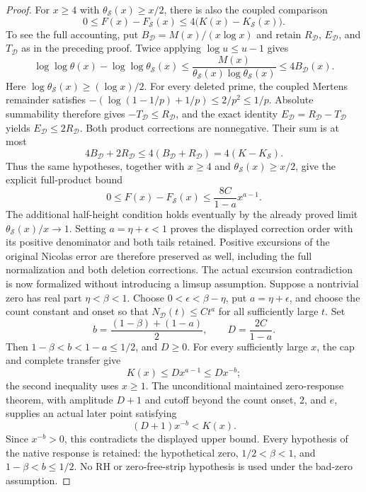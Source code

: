 \documentclass[11pt]{article}
\theoremstyle{definition}
\begin{document}
\begin{proof}
For \(x\ge4\) with \(\theta_{\mathcal S}(x)\ge x/2\), there is also
the coupled comparison
\[
 0\le F(x)-F_{\mathcal S}(x)
 \le4\bigl(K(x)-K_{\mathcal S}(x)\bigr).
\]
To see the full accounting, put
\(B_{\mathcal D}=M(x)/(x\log x)\) and retain
\(R_{\mathcal D}\), \(E_{\mathcal D}\), and \(T_{\mathcal D}\)
as in the preceding proof. Twice applying \(\log u\le u-1\) gives
\[
 \log\log\theta(x)-\log\log\theta_{\mathcal S}(x)
 \le\frac{M(x)}
          {\theta_{\mathcal S}(x)\log\theta_{\mathcal S}(x)}
 \le4B_{\mathcal D}(x).
\]
Here \(\log\theta_{\mathcal S}(x)\ge(\log x)/2\).
For every deleted prime, the coupled Mertens remainder satisfies
\(-(\log(1-1/p)+1/p)\le2/p^2\le1/p\).
Absolute summability therefore gives
\(-T_{\mathcal D}\le R_{\mathcal D}\), and the exact identity
\(E_{\mathcal D}=R_{\mathcal D}-T_{\mathcal D}\) yields
\(E_{\mathcal D}\le2R_{\mathcal D}\).
Both product corrections are nonnegative. Their sum is at most
\[
 4B_{\mathcal D}+2R_{\mathcal D}
 \le4(B_{\mathcal D}+R_{\mathcal D})
 =4(K-K_{\mathcal S}).
\]
Thus the same hypotheses, together with \(x\ge4\) and
\(\theta_{\mathcal S}(x)\ge x/2\), give the explicit full-product bound
\[
 0\le F(x)-F_{\mathcal S}(x)\le
       \frac{8C}{1-a}x^{a-1}.
\]
The additional half-height condition holds eventually by the already
proved limit \(\theta_{\mathcal S}(x)/x\to1\).
Setting \(a=\eta+\epsilon<1\) proves the displayed correction order
with its positive denominator and both tails retained.
Positive excursions of the original Nicolas error
are therefore preserved as well, including the full normalization
and both deletion corrections.
The actual excursion contradiction is now formalized without introducing
a limsup assumption. Suppose a nontrivial zero has real part
\(\eta<\beta<1\). Choose \(0<\epsilon<\beta-\eta\), put
\(a=\eta+\epsilon\), and choose the count constant and onset so that
\(N_{\mathcal D}(t)\le Ct^a\) for all sufficiently large \(t\).
Set
\[
 b=\frac{(1-\beta)+(1-a)}2,\qquad D=\frac{2C}{1-a}.
\]
Then \(1-\beta<b<1-a\le1/2\), and \(D\ge0\).
For every sufficiently large \(x\), the cap and complete transfer give
\[
 K(x)\le D x^{a-1}\le D x^{-b};
\]
the second inequality uses \(x\ge1\).
The unconditional maintained zero-response theorem, with amplitude
\(D+1\) and cutoff beyond the count onset, \(2\), and \(e\), supplies
an actual later point satisfying
\[
 (D+1)x^{-b}<K(x).
\]
Since \(x^{-b}>0\), this contradicts the displayed upper bound.
Every hypothesis of the native response is retained: the hypothetical
zero, \(1/2<\beta<1\), and \(1-\beta<b\le1/2\).
No RH or zero-free-strip hypothesis is used under the bad-zero assumption.
\end{proof}
\end{document}
